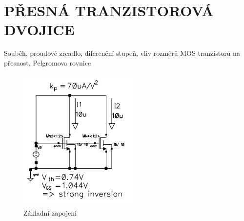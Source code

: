 \section{PŘESNÁ TRANZISTOROVÁ DVOJICE}
Souběh, proudové zrcadlo, diferenční stupeň, vliv rozměrů MOS tranzistorů na přesnost, Pelgromova rovnice

\begin{figure}[h]
   \begin{center}
     \includegraphics[scale=0.5]{images/MOS6.png}
   \end{center}
   \caption{Základní zapojení}
\end{figure}
